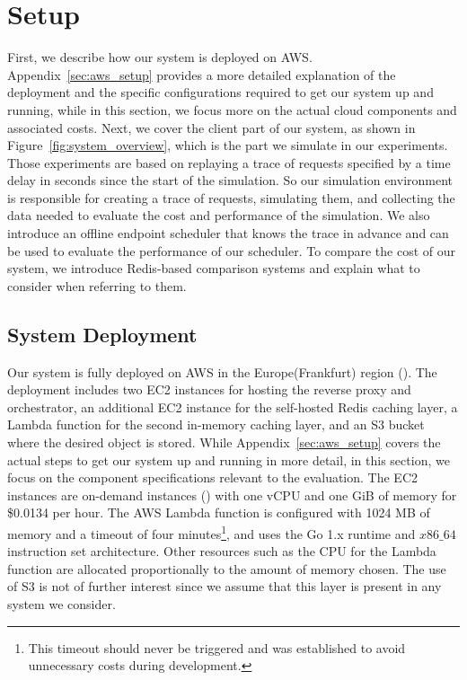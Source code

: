 \section{Setup}
\label{sec:setup}
First, we describe how our system is deployed on AWS. Appendix~\ref{sec:aws_setup} provides a more detailed explanation of the deployment and the specific configurations required to get our system up and running, while in this section, we focus more on the actual cloud components and associated costs. Next, we cover the client part of our system, as shown in Figure~\ref{fig:system_overview}, which is the part we simulate in our experiments. Those experiments are based on replaying a trace of requests specified by a time delay in seconds since the start of the simulation. So our simulation environment is responsible for creating a trace of requests, simulating them, and collecting the data needed to evaluate the cost and performance of the simulation. We also introduce an offline endpoint scheduler that knows the trace in advance and can be used to evaluate the performance of our scheduler. To compare the cost of our system, we introduce Redis-based comparison systems and explain what to consider when referring to them.

\subsection{System Deployment}
\label{subsec:system_deployment}
Our system is fully deployed on AWS in the Europe(Frankfurt) region (). The deployment includes two EC2 instances for hosting the reverse proxy and orchestrator, an additional EC2 instance for the self-hosted Redis caching layer, a Lambda function for the second in-memory caching layer, and an S3 bucket where the desired object is stored. While Appendix~\ref{sec:aws_setup} covers the actual steps to get our system up and running in more detail, in this section, we focus on the component specifications relevant to the evaluation. The EC2 instances are on-demand instances () with one vCPU and one GiB of memory for \$0.0134 per hour. The AWS Lambda function is configured with 1024 MB of memory and a timeout of four minutes\footnote{This timeout should never be triggered and was established to avoid unnecessary costs during development.}, and uses the Go 1.x runtime and $x86\_64$ instruction set architecture. Other resources such as the CPU for the Lambda function are allocated proportionally to the amount of memory chosen. The use of S3 is not of further interest since we assume that this layer is present in any system we consider.



